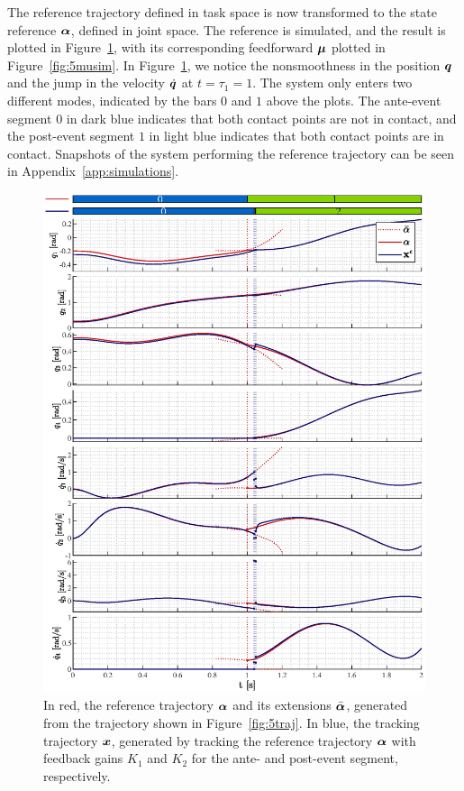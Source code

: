\documentclass[../DC2019003Bouma.tex]{subfiles}
\begin{document}
The reference trajectory defined in task space is now transformed to the state reference $\boldsymbol{\alpha}$, defined in joint space. The reference is simulated, and the result is plotted in Figure~\ref{fig:5alphasim}, with its corresponding feedforward $\boldsymbol{\mu}$ plotted in Figure~\ref{fig:5musim}. In Figure~\ref{fig:5alphasim}, we notice the nonsmoothness in the position ${\boldsymbol{q}}$ and the jump in the velocity $\dot{{\boldsymbol{q}}}$ at $t=\tau_1=1$. The system only enters two different modes, indicated by the bars $0$ and $1$ above the plots. The ante-event segment $0$ in dark blue indicates that both contact points are not in contact, and the post-event segment $1$ in light blue indicates that both contact points are in contact. Snapshots of the system performing the reference trajectory can be seen in Appendix~\ref{app:simulations}.
\begin{figure}[bt!]
\centering
\includegraphics[width=\textwidth]{allstates.eps}
\caption{In red, the reference trajectory $\boldsymbol{\alpha}$ and its extensions $\bar{\boldsymbol{\alpha}}$, generated from the trajectory shown in Figure~\ref{fig:5traj}. In blue, the tracking trajectory ${\boldsymbol{x}}$, generated by tracking the reference trajectory $\boldsymbol{\alpha}$ with feedback gains $K_1$ and $K_2$ for the ante- and post-event segment, respectively.}\label{fig:5alphasim}
\end{figure}
\end{document}
